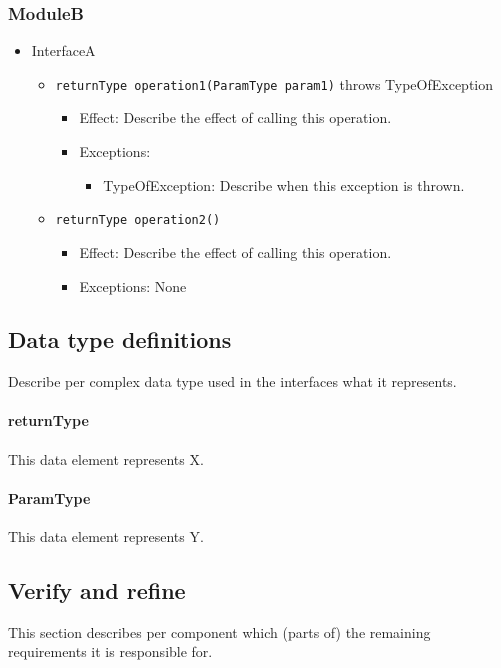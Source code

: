     \subsubsection{ModuleB}
    \begin{itemize}
    	\item InterfaceA
    	\begin{itemize}
    		\item \texttt{returnType operation1(ParamType param1)} throws TypeOfException
    		\begin{itemize}
    			\item Effect: Describe the effect of calling this operation.
    			\item Exceptions:
    			\begin{itemize}
    				\item TypeOfException: Describe when this exception is thrown.
    			\end{itemize}
    		\end{itemize}

    		\item \texttt{returnType operation2()}
    		\begin{itemize}
    			\item Effect: Describe the effect of calling this operation.
    			\item Exceptions: None
    		\end{itemize}
    	\end{itemize}
    \end{itemize}

\subsection{Data type definitions}
    Describe per complex data type used in the interfaces what it represents.

    \paragraph{returnType} This data element represents X.

    \paragraph{ParamType} This data element represents Y.

\subsection{Verify and refine}
    This section describes per component which (parts of) the remaining
    requirements it is responsible for.

